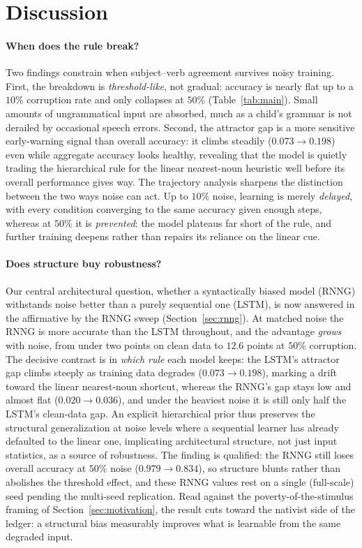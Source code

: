 \section{Discussion}
\label{sec:discussion}


\paragraph{When does the rule break?}
Two findings constrain when subject--verb agreement survives noisy training.
First, the breakdown is \emph{threshold-like}, not gradual: accuracy is nearly
flat up to a $10\%$ corruption rate and only collapses at $50\%$
(Table~\ref{tab:main}). Small amounts of ungrammatical input are absorbed, much
as a child's grammar is not derailed by occasional speech errors. Second, the
attractor gap is a more sensitive early-warning signal than overall accuracy:
it climbs steadily ($0.073 \to 0.198$) even while aggregate accuracy looks
healthy, revealing that the model is quietly trading the hierarchical rule for
the linear nearest-noun heuristic well before its overall performance gives way.
The trajectory analysis sharpens the distinction between the two ways noise can
act. Up to $10\%$ noise, learning is merely \emph{delayed}, with every condition
converging to the same accuracy given enough steps, whereas at $50\%$ it is
\emph{prevented}: the model plateaus far short of the rule, and further training
deepens rather than repairs its reliance on the linear cue.

\paragraph{Does structure buy robustness?}
Our central architectural question, whether a syntactically biased model (RNNG)
withstands noise better than a purely sequential one (LSTM), is now answered in
the affirmative by the RNNG sweep (Section~\ref{sec:rnng}). At matched noise the
RNNG is more accurate than the LSTM throughout, and the advantage \emph{grows}
with noise, from under two points on clean data to $12.6$ points at $50\%$
corruption. The decisive contrast is in \emph{which rule} each model keeps: the
LSTM's attractor gap climbs steeply as training data degrades
($0.073 \to 0.198$), marking a drift toward the linear nearest-noun shortcut,
whereas the RNNG's gap stays low and almost flat ($0.020 \to 0.036$), and under
the heaviest noise it is still only half the LSTM's clean-data gap. An explicit
hierarchical prior thus preserves the structural generalization at noise levels
where a sequential learner has already defaulted to the linear one, implicating
architectural structure, not just input statistics, as a source of robustness.
The finding is qualified: the RNNG still loses overall accuracy at $50\%$ noise
($0.979 \to 0.834$), so structure blunts rather than abolishes the threshold
effect, and these RNNG values rest on a single (full-scale) seed pending the
multi-seed replication. Read against the poverty-of-the-stimulus framing of
Section~\ref{sec:motivation}, the result cuts toward the nativist side of the
ledger: a structural bias measurably improves what is learnable from the same
degraded input.

